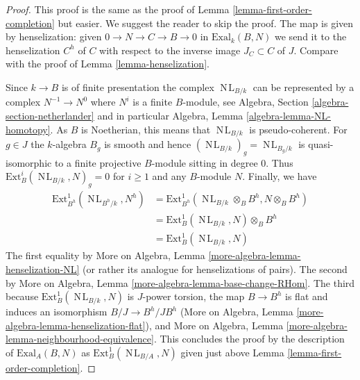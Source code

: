 \documentclass[10pt,a4paper]{amsart}
\theoremstyle{plain}
\theoremstyle{definition}
\theoremstyle{remark}
\numberwithin{equation}{subsection}
\def\NL{\mathop{N\!L}\nolimits}
\begin{document}
\begin{proof}
This proof is the same as the proof of
Lemma \ref{lemma-first-order-completion} but easier. We suggest the
reader to skip the proof.
The map is given by henselization: given $0 \to N \to C \to B \to 0$
in $\text{Exal}_k(B, N)$ we send it to the
henselization $C^h$
of $C$ with respect to the inverse image $J_C \subset C$ of $J$.
Compare with the proof of Lemma \ref{lemma-henselization}.

\medskip\noindent
Since $k \to B$ is of finite presentation the complex
$\NL_{B/k}$ can be represented by a complex
$N^{-1} \to N^0$ where $N^i$ is a finite $B$-module, see
Algebra, Section \ref{algebra-section-netherlander} and
in particular
Algebra, Lemma \ref{algebra-lemma-NL-homotopy}.
As $B$ is Noetherian, this means that $\NL_{B/k}$
is pseudo-coherent. For $g \in J$ the $k$-algebra $B_g$
is smooth and hence $(\NL_{B/k})_g = \NL_{B_g/k}$
is quasi-isomorphic to a finite projective $B$-module sitting in degree $0$.
Thus $\text{Ext}^i_B(\NL_{B/k}, N)_g = 0$ for $i \geq 1$
and any $B$-module $N$. Finally, we have
\begin{align*}
\text{Ext}^1_{B^h}(\NL_{B^h/k}, N^h)
& =
\text{Ext}^1_{B^h}(\NL_{B/k} \otimes_B B^h, N \otimes_B B^h) \\
& =
\text{Ext}^1_B(\NL_{B/k}, N) \otimes_B B^h \\
& =
\text{Ext}^1_B(\NL_{B/k}, N)
\end{align*}
The first equality by
More on Algebra, Lemma \ref{more-algebra-lemma-henselization-NL}
(or rather its analogue for henselizations of pairs).
The second by
More on Algebra, Lemma \ref{more-algebra-lemma-base-change-RHom}.
The third because $\text{Ext}^1_B(\NL_{B/k}, N)$ is $J$-power
torsion, the map $B \to B^h$ is flat and induces an isomorphism
$B/J \to B^h/JB^h$ (More on Algebra, Lemma
\ref{more-algebra-lemma-henselization-flat}), and
More on Algebra, Lemma \ref{more-algebra-lemma-neighbourhood-equivalence}.
This concludes the proof by the description of $\text{Exal}_A(B, N)$
as $\text{Ext}^1_B(\NL_{B/A}, N)$ given just above
Lemma \ref{lemma-first-order-completion}.
\end{proof}
\end{document}
